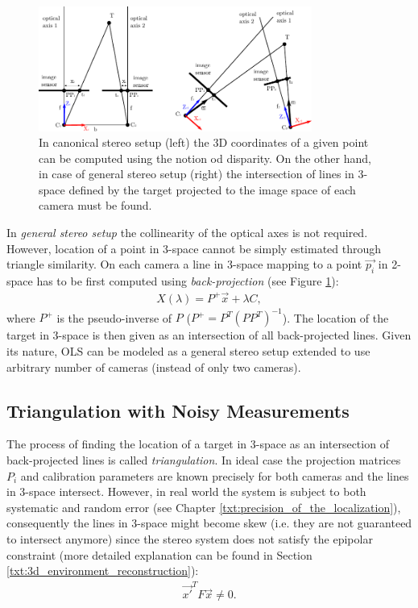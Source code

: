 \begin{figure}[tbh]
	\centering
	\includegraphics[width=0.8\textwidth]{fig/canonical_stereo_vs_general_stereo.pdf}
	\caption{In canonical stereo setup (left) the 3D coordinates of a given point can be computed using the notion od disparity. On the other hand, in case of general stereo setup (right) the intersection of lines in 3-space defined by the target projected to the image space of each camera must be found.}
	\label{fig:canonical_vs_general_stereo}
\end{figure}

In \textit{general stereo setup} the collinearity of the optical axes is not required. However, location of a point in 3-space cannot be simply estimated through triangle similarity. On each camera a line in 3-space mapping to a point $\vec{p_{i}}$ in 2-space has to be first computed using \textit{back-projection} (see Figure \ref{fig:canonical_vs_general_stereo}):
\begin{align}
	X(\lambda) = P^{+}\vec{x} + \lambda C,
\end{align}
where $P^{+}$ is the pseudo-inverse of $P$ ($P^{+} = P^{T}(PP^{T})^{-1}$). The location of the target in 3-space is then given as an intersection of all back-projected lines. Given its nature, OLS can be modeled as a general stereo setup extended to use arbitrary number of cameras (instead of only two cameras).

\subsection{Triangulation with Noisy Measurements}

The process of finding the location of a target in 3-space as an intersection of back-projected lines is called \textit{triangulation}. In ideal case the projection matrices $P_{i}$ and calibration parameters are known precisely for both cameras and the lines in 3-space intersect. However, in real world the system is subject to both systematic and random error (see Chapter \ref{txt:precision_of_the_localization}), consequently the lines in 3-space might become skew (i.e. they are not guaranteed to intersect anymore) since the stereo system does not satisfy the epipolar constraint \cite{Hartley:2003:MVG:861369} (more detailed explanation can be found in Section \ref{txt:3d_environment_reconstruction}):
\begin{align}
	\vec{x'}^{T}F\vec{x} \neq 0.
\end{align}


